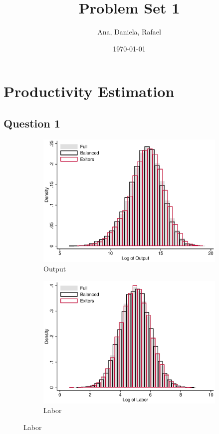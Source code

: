 \documentclass[11pt]{article}
\title{Problem Set 1}
\author{Ana, Daniela, Rafael}
\date{\today}
\begin{document}
\maketitle

\section*{Productivity Estimation}

\subsection*{Question 1} \label{q1}






\begin{figure}[ht]
	\caption{Distribution by samples}\label{fig:sumstat}
	\centering	
	\begin{subfigure}[b]{.3\textwidth}
		\centering
		\caption{Output}
		\includegraphics[width=\textwidth]{histY.eps}
	\end{subfigure}
	\begin{subfigure}[b]{.3\textwidth}
		\centering
		\caption{Labor}
		\includegraphics[width=\textwidth]{histL.eps}

\end{subfigure}
\end{figure}
\end{document}
